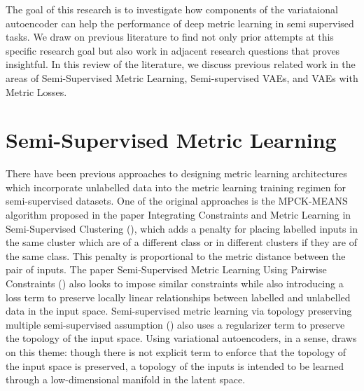 \documentclass[./dissertation.tex]{subfiles}
\begin{document}

The goal of this research is to investigate how components of the variataional autoencoder can help the performance of deep metric learning in semi supervised tasks. We draw on previous literature to find not only prior attempts at this specific research goal but also work in adjacent research questions that proves insightful. In this review of the literature, we discuss previous related work in the areas of Semi-Supervised Metric Learning, Semi-supervised VAEs, and VAEs with Metric Losses. 


\section{Semi-Supervised Metric Learning}
There have been previous approaches to designing metric learning architectures which incorporate unlabelled data into the metric learning training regimen for semi-supervised datasets. One of the original approaches is the MPCK-MEANS algorithm proposed in the paper Integrating Constraints and Metric Learning in Semi-Supervised Clustering (\cite{bilenko2004integrating}), which adds a penalty for placing labelled inputs in the same cluster which are of a different class or in different clusters if they are of the same class. This penalty is proportional to the metric distance between the pair of inputs. The paper Semi-Supervised Metric Learning Using Pairwise Constraints (\cite{baghshah2009semi}) also looks to impose similar constraints while also introducing a loss term to preserve locally linear relationships between labelled and unlabelled data in the input space. Semi-supervised metric learning via topology preserving multiple semi-supervised assumption (\cite{wang2013semi}) also uses a regularizer term to preserve the topology of the input space. Using variational autoencoders, in a sense, draws on this theme: though there is not explicit term to enforce that the topology of the input space is preserved, a topology of the inputs is intended to be learned through a low-dimensional manifold in the latent space. \\
\end{document}
